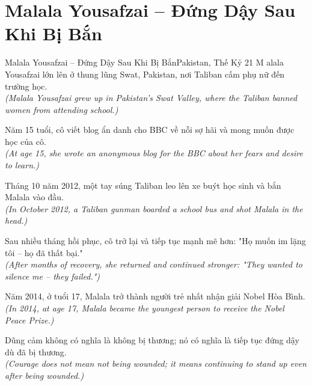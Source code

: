 \section{Malala Yousafzai -- Đứng Dậy Sau Khi Bị Bắn}
\begin{truyen}{Malala Yousafzai -- Đứng Dậy Sau Khi Bị Bắn}{Pakistan, Thế Kỷ 21}
M alala Yousafzai lớn lên ở thung lũng Swat, Pakistan, nơi Taliban cấm phụ nữ đến trường học.\\
\textit{(Malala Yousafzai grew up in Pakistan's Swat Valley, where the Taliban banned women from attending school.)}

Năm 15 tuổi, cô viết blog ẩn danh cho BBC về nỗi sợ hãi và mong muốn được học của cô.\\
\textit{(At age 15, she wrote an anonymous blog for the BBC about her fears and desire to learn.)}

Tháng 10 năm 2012, một tay súng Taliban leo lên xe buýt học sinh và bắn Malala vào đầu.\\
\textit{(In October 2012, a Taliban gunman boarded a school bus and shot Malala in the head.)}

Sau nhiều tháng hồi phục, cô trở lại và tiếp tục mạnh mẽ hơn: "Họ muốn im lặng tôi -- họ đã thất bại."\\
\textit{(After months of recovery, she returned and continued stronger: "They wanted to silence me -- they failed.")}

Năm 2014, ở tuổi 17, Malala trở thành người trẻ nhất nhận giải Nobel Hòa Bình.\\
\textit{(In 2014, at age 17, Malala became the youngest person to receive the Nobel Peace Prize.)}

\end{truyen}
\begin{baihoc}
  Dũng cảm không có nghĩa là không bị thương; nó có nghĩa là tiếp tục đứng dậy dù đã bị thương.\\
  \textit{(Courage does not mean not being wounded; it means continuing to stand up even after being wounded.)}
\end{baihoc}

